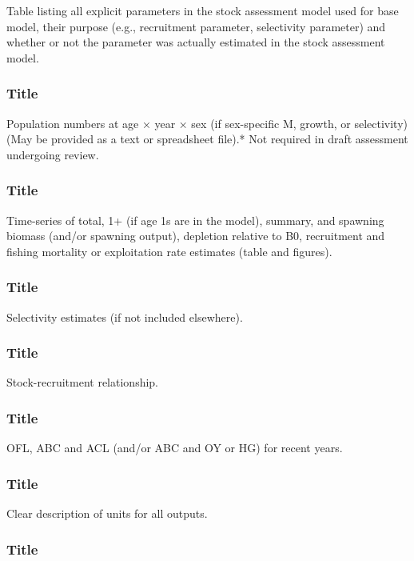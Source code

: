 \documentclass[12pt,]{article}
\begin{document}
Table listing all explicit parameters in the stock assessment model used
for base model, their purpose (e.g., recruitment parameter, selectivity
parameter) and whether or not the parameter was actually estimated in
the stock assessment model.

\subsubsection{Title}\label{title-25}

Population numbers at age × year × sex (if sex-specific M, growth, or
selectivity) (May be provided as a text or spreadsheet file).* Not
required in draft assessment undergoing review.

\subsubsection{Title}\label{title-26}

Time-series of total, 1+ (if age 1s are in the model), summary, and
spawning biomass (and/or spawning output), depletion relative to B0,
recruitment and fishing mortality or exploitation rate estimates (table
and figures).

\subsubsection{Title}\label{title-27}

Selectivity estimates (if not included elsewhere).

\subsubsection{Title}\label{title-28}

Stock-recruitment relationship.

\subsubsection{Title}\label{title-29}

OFL, ABC and ACL (and/or ABC and OY or HG) for recent years.

\subsubsection{Title}\label{title-30}

Clear description of units for all outputs.

\subsubsection{Title}\label{title-31}
\end{document}
